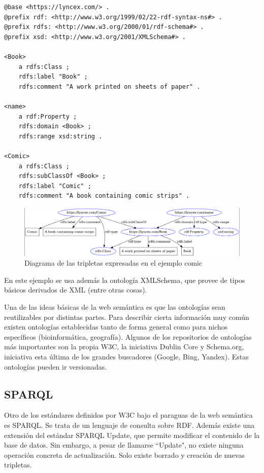 \documentclass[12pt]{report} %
\begin{document}
\begin{lstlisting}
@base <https://lyncex.com/> .
@prefix rdf: <http://www.w3.org/1999/02/22-rdf-syntax-ns#> .
@prefix rdfs: <http://www.w3.org/2000/01/rdf-schema#> .
@prefix xsd: <http://www.w3.org/2001/XMLSchema#> .

<Book>
    a rdfs:Class ;
    rdfs:label "Book" ;
    rdfs:comment "A work printed on sheets of paper" .

<name>
    a rdf:Property ;
    rdfs:domain <Book> ;
    rdfs:range xsd:string .

<Comic>
    a rdfs:Class ;
    rdfs:subClassOf <Book> ;
    rdfs:label "Comic" ;
    rdfs:comment "A book containing comic strips" .

\end{lstlisting}
\begin{figure}
    \centering
    \includegraphics[width=\textwidth]{comic.png}
    \caption{Diagrama de las tripletas expresadas en el ejemplo comic}
    \label{fig:comic}
\end{figure}

En este ejemplo se usa además la ontología XMLSchema\cite{xmlschema}, que provee de tipos básicos derivados de XML (entre otras cosas).

Una de las ideas básicas de la web semántica es que las ontologías sean reutilizables por distintas partes. Para describir cierta información muy común existen ontologías establecidas tanto de forma general como para nichos específicos (bioinformática, geografía). Algunos de los repositorios de ontologías más importantes son la propia W3C, la iniciativa Dublin Core\cite{dublincore} y Schema.org\cite{schema}, iniciativa esta última de los grandes buscadores (Google, Bing, Yandex). Estas ontologías pueden ir versionadas.


\subsection{SPARQL}

Otro de los estándares definidos por W3C bajo el paraguas de la web semántica es SPARQL\cite{sparql}. Se trata de un lenguaje de consulta sobre RDF. Además existe una extensión del estándar SPARQL Update, que permite modificar el contenido de la base de datos. Sin embargo, a pesar de llamarse ``Update", no existe ninguna operación concreta de actualización. Solo existe borrado y creación de nuevas tripletas.
\end{document}
